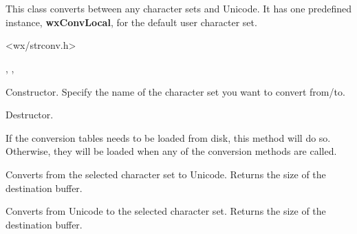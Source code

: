 %
%

\section{}\label{wxcsconv}

This class converts between any character sets and Unicode.
It has one predefined instance, {\bf wxConvLocal}, for the
default user character set.




<wx/strconv.h>


, 
, 


\label{wxcsconvwxcsconv}


Constructor. Specify the name of the character set you want to convert
from/to.

\label{wxcsconvdtor}


Destructor.

\label{wxcsconvloadnow}


If the conversion tables needs to be loaded from disk, this method
will do so. Otherwise, they will be loaded when any of the conversion
methods are called.

\label{wxcsconvmb2wc}


Converts from the selected character set to Unicode. Returns the size of the destination buffer.

\label{wxcsconvwc2mb}


Converts from Unicode to the selected character set. Returns the size of the destination buffer.

